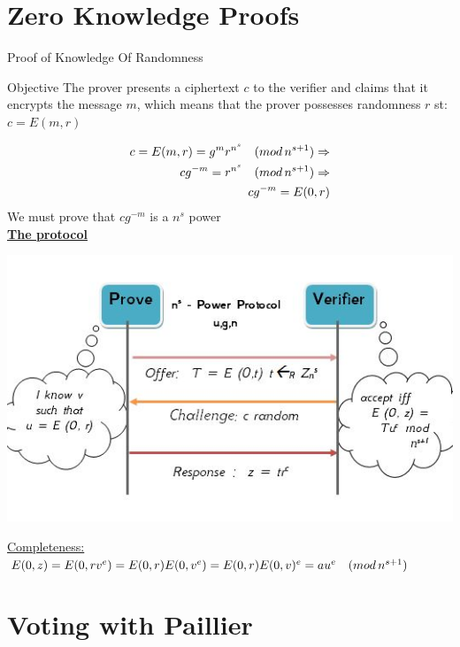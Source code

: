 \documentclass{beamer}
\begin{document}
\section{Zero Knowledge Proofs}

\begin{frame}[allowframebreaks]{Proof of Knowledge Of Randomness}
\begin{block}{Objective}
The prover presents a ciphertext $c$ to the verifier and claims that it encrypts the message $m$, which means that the prover possesses randomness $r$ st: 
$c = E(m,r)$
\end{block}
\begin{align*}
c = E(m,r) = g^m r^{n^s} \quad (mod \, {n^{s+1}}) \Rightarrow \\
c g^{-m} = r^{n^s} \quad (mod \, {n^{s+1}}) \Rightarrow \\
c g^{-m} = E(0,r)
\end{align*}
We must prove that $c g^{-m}$ is a $n^s$ power \\
\uline{\textbf{The protocol}}
\begin{center}
\includegraphics[scale=0.50]{ns-power.jpg}
\end{center}

\uline {Completeness:} $E(0,z) = E(0,rv^e) = E(0,r) E(0,v^e) = E(0,r) E(0,v)^e = a u^e \quad (mod \, {n^{s+1}})$
\end{frame}


\section{Voting with Paillier}
 
\end{document}
